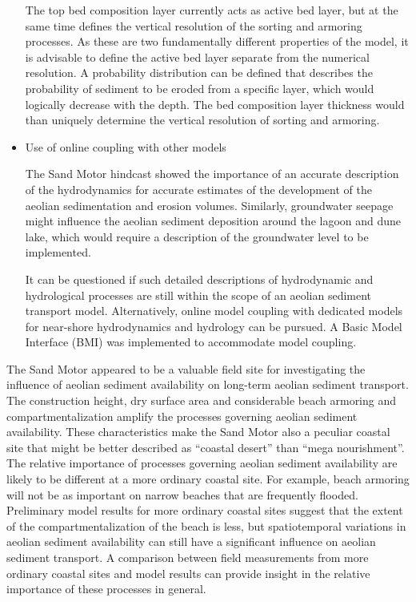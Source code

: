 \begin{itemize}
  The top bed composition layer currently acts as active bed layer,
  but at the same time defines the vertical resolution of the sorting
  and armoring processes. As these are two fundamentally different
  properties of the model, it is advisable to define the active bed
  layer separate from the numerical resolution. A probability
  distribution can be defined that describes the probability of
  sediment to be eroded from a specific layer, which would logically
  decrease with the depth. The bed composition layer thickness would
  than uniquely determine the vertical resolution of sorting and
  armoring.

\item Use of online coupling with other models

  The Sand Motor hindcast showed the importance of an accurate
  description of the hydrodynamics for accurate estimates of the
  development of the aeolian sedimentation and erosion
  volumes. Similarly, groundwater seepage might influence the aeolian
  sediment deposition around the lagoon and dune lake, which would
  require a description of the groundwater level to be implemented.

  It can be questioned if such detailed descriptions of hydrodynamic
  and hydrological processes are still within the scope of an aeolian
  sediment transport model. Alternatively, online model coupling with
  dedicated models for near-shore hydrodynamics and hydrology can be
  pursued. A Basic Model Interface (BMI) was implemented to
  accommodate model coupling.

\end{itemize}

The Sand Motor appeared to be a valuable field site for investigating
the influence of aeolian sediment availability on long-term aeolian
sediment transport. The construction height, dry surface area and
considerable beach armoring and compartmentalization amplify the
processes governing aeolian sediment availability. These
characteristics make the Sand Motor also a peculiar coastal site that
might be better described as ``coastal desert'' than ``mega
nourishment''. The relative importance of processes governing aeolian
sediment availability are likely to be different at a more ordinary
coastal site. For example, beach armoring will not be as important on
narrow beaches that are frequently flooded. Preliminary model results
for more ordinary coastal sites suggest that the extent of the
compartmentalization of the beach is less, but spatiotemporal
variations in aeolian sediment availability can still have a
significant influence on aeolian sediment transport. A comparison
between field measurements from more ordinary coastal sites and model
results can provide insight in the relative importance of these
processes in general.

